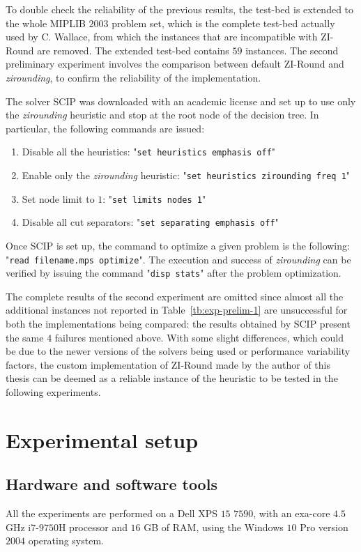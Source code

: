 \documentclass[a4paper,12pt]{book}
\begin{document}
To double check the reliability of the previous results, the test-bed is extended to the whole MIPLIB $2003$ problem set, which is the complete test-bed actually used by C. Wallace, from which the instances that are incompatible with ZI-Round are removed. The extended test-bed contains $59$ instances. The second preliminary experiment involves the comparison between default ZI-Round and \textit{zirounding}, to confirm the reliability of the implementation. \par 

The solver SCIP was downloaded with an academic license and set up to use only the \textit{zirounding} heuristic and stop at the root node of the decision tree. In particular, the following commands are issued:
\begin{enumerate}
	\item Disable all the heuristics: "\texttt{set heuristics emphasis off}"
	\item Enable only the \textit{zirounding} heuristic: "\texttt{set heuristics zirounding freq 1}"
	\item Set node limit to $1$: "\texttt{set limits nodes 1}"
	\item Disable all cut separators: "\texttt{set separating emphasis off}"
\end{enumerate}
Once SCIP is set up, the command to optimize a given problem is the following: "\texttt{read filename.mps optimize}". The execution and success of \textit{zirounding} can be verified by issuing the command "\texttt{disp stats}" after the problem optimization. \par

The complete results of the second experiment are omitted since almost all the additional instances not reported in Table~\ref{tb:exp-prelim-1} are unsuccessful for both the implementations being compared: the results obtained by SCIP present the same $4$ failures mentioned above. With some slight differences, which could be due to the newer versions of the solvers being used or performance variability factors, the custom implementation of ZI-Round made by the author of this thesis can be deemed as a reliable instance of the heuristic to be tested in the following experiments.

\section{Experimental setup} \label{sec:expsetup}

\subsection{Hardware and software tools}
All the experiments are performed on a Dell XPS $15$ $7590$, with an exa-core $4.5$ GHz i$7$-$9750$H processor and $16$ GB of RAM, using the Windows $10$ Pro version $2004$ operating system. \par
\end{document}
